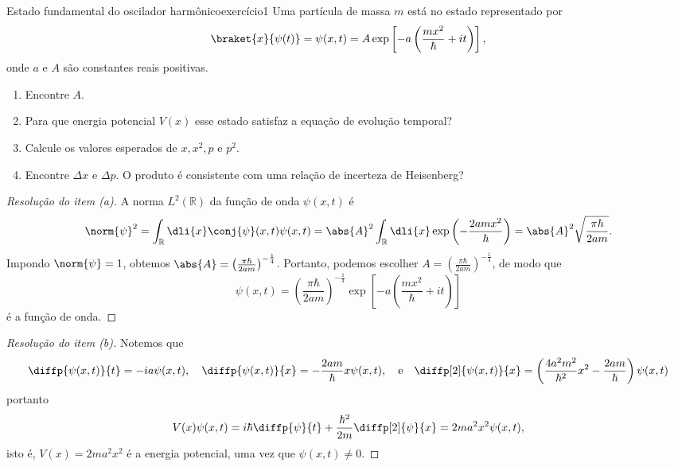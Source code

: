 \begin{exercício}{Estado fundamental do oscilador harmônico}{exercício1}
    Uma partícula de massa \(m\) está no estado representado por
    \begin{equation*}
        \braket{x}{\psi(t)} = \psi(x,t) = A\exp\left[-a\left(\frac{mx^2}{\hbar} + it\right)\right],
    \end{equation*}
    onde \(a\) e \(A\) são constantes reais positivas.
    \begin{enumerate}[label=(\alph*)]
        \item Encontre \(A\).
        \item Para que energia potencial \(V(x)\) esse estado satisfaz a equação de evolução temporal?
        \item Calcule os valores esperados de \(x, x^2, p\) e \(p^2\).
        \item Encontre \(\Delta x\) e \(\Delta p\). O produto é consistente com uma relação de incerteza de Heisenberg?
    \end{enumerate}
\end{exercício}
\begin{proof}[Resolução do item (a)]
    A norma \(L^2(\mathbb{R})\) da função de onda \(\psi(x, t)\) é
    \begin{equation*}
        \norm{\psi}^2 = \int_{\mathbb{R}} \dli{x} \conj{\psi}(x,t)\psi(x,t) =\abs{A}^2 \int_{\mathbb{R}} \dli{x} \exp\left(-\frac{2amx^2}{\hbar}\right) = \abs{A}^2 \sqrt{\frac{\pi \hbar}{2 a m}}.
    \end{equation*}
    Impondo \(\norm{\psi} = 1\), obtemos \(\abs{A} = \left(\frac{\pi\hbar}{2 am}\right)^{-\frac14}\). Portanto, podemos escolher \(A = \left(\frac{\pi\hbar}{2 am}\right)^{-\frac14}\), de modo que
    \begin{equation*}
        \psi(x,t) = \left(\frac{\pi\hbar}{2 am}\right)^{-\frac14} \exp\left[-a\left(\frac{mx^2}{\hbar} + it\right)\right]
    \end{equation*}
    é a função de onda.
\end{proof}
\begin{proof}[Resolução do item (b)]
    Notemos que
    \begin{equation*}
        \diffp{\psi(x,t)}{t} = -ia\psi(x,t),\quad\diffp{\psi(x,t)}{x} = -\frac{2a m}{\hbar}x\psi(x,t),\quad\text{e}\quad\diffp[2]{\psi(x,t)}{x} = \left(\frac{4a^2 m^2}{\hbar^2}x^2 - \frac{2a m}{\hbar}\right)\psi(x,t)
    \end{equation*}
    portanto
    \begin{equation*}
        V(x) \psi(x, t) = i\hbar \diffp{\psi}{t} + \frac{\hbar^2}{2m}\diffp[2]{\psi}{x} = 2m a^2 x^2 \psi(x, t),
    \end{equation*}
    isto é, \(V(x) = 2m a^2 x^2\) é a energia potencial, uma vez que \(\psi(x, t) \neq 0\).
\end{proof}
